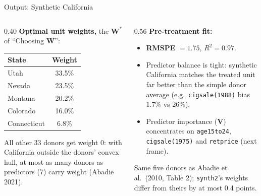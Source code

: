 \documentclass[main.tex]{subfiles}
\begin{document}
\begin{frame}{Output: Synthetic California}

  \begin{columns}[T]
    \begin{column}{0.40\textwidth}
      \textbf{Optimal unit weights,} the $\mathbf{W}^{*}$ of ``Choosing
      $\mathbf{W}$'':
      \smallskip
      \footnotesize
      \begin{tabular}{lc}
        \toprule
        State & Weight \\
        \midrule
        Utah        & 33.5\% \\
        Nevada      & 23.5\% \\
        Montana     & 20.2\% \\
        Colorado    & 16.0\% \\
        Connecticut & 6.8\% \\
        \bottomrule
      \end{tabular}

      \medskip
      \normalsize
      All other 33 donors get weight 0: with California outside the donors'
      convex hull, at most as many donors as predictors (7) carry weight
      (Abadie 2021).
    \end{column}
    \begin{column}{0.56\textwidth}
      \textbf{Pre-treatment fit:}
      \begin{itemize}
        \item \textbf{RMSPE} $= 1.75$, \quad $R^2 = 0.97$.
        \item Predictor balance is tight: synthetic California matches the
          treated unit far better than the simple donor average (e.g.\
          \texttt{cigsale(1988)} bias $1.7\%$ vs $26\%$).
        \item Predictor importance ($\mathbf{V}$) concentrates on
          \texttt{age15to24}, \texttt{cigsale(1975)} and \texttt{retprice}
          (next frame).
      \end{itemize}

      \medskip
      \footnotesize Same five donors as Abadie et al.\ (2010, Table 2);
      \texttt{synth2}'s weights differ from theirs by at most 0.4 points.
    \end{column}
  \end{columns}

\end{frame}
\end{document}
